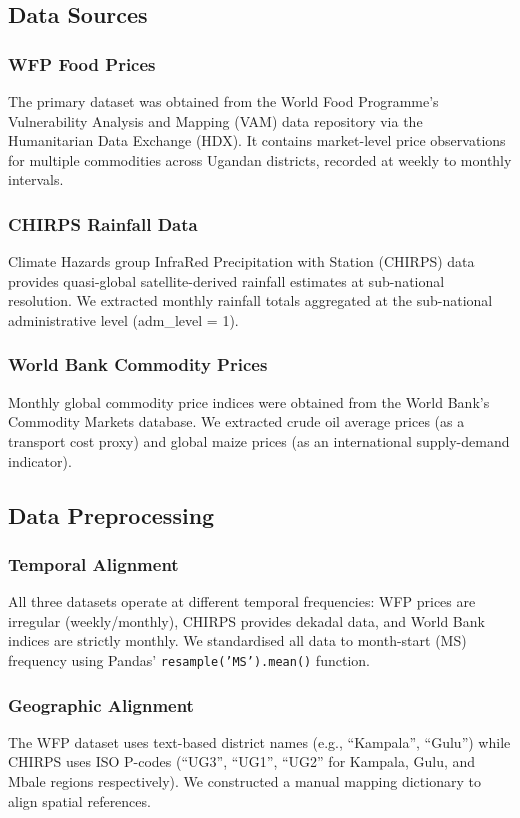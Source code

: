 \documentclass[12pt,a4paper]{article}
\begin{document}
\subsection{Data Sources}

\subsubsection{WFP Food Prices}
The primary dataset was obtained from the World Food Programme's Vulnerability Analysis and Mapping (VAM) data repository via the Humanitarian Data Exchange (HDX). It contains market-level price observations for multiple commodities across Ugandan districts, recorded at weekly to monthly intervals.

\subsubsection{CHIRPS Rainfall Data}
Climate Hazards group InfraRed Precipitation with Station (CHIRPS) data provides quasi-global satellite-derived rainfall estimates at sub-national resolution. We extracted monthly rainfall totals aggregated at the sub-national administrative level (adm\_level = 1).

\subsubsection{World Bank Commodity Prices}
Monthly global commodity price indices were obtained from the World Bank's Commodity Markets database. We extracted crude oil average prices (as a transport cost proxy) and global maize prices (as an international supply-demand indicator).

\subsection{Data Preprocessing}

\subsubsection{Temporal Alignment}
All three datasets operate at different temporal frequencies: WFP prices are irregular (weekly/monthly), CHIRPS provides dekadal data, and World Bank indices are strictly monthly. We standardised all data to month-start (MS) frequency using Pandas' \texttt{resample('MS').mean()} function.

\subsubsection{Geographic Alignment}
The WFP dataset uses text-based district names (e.g., ``Kampala'', ``Gulu'') while CHIRPS uses ISO P-codes (``UG3'', ``UG1'', ``UG2'' for Kampala, Gulu, and Mbale regions respectively). We constructed a manual mapping dictionary to align spatial references.
\end{document}

